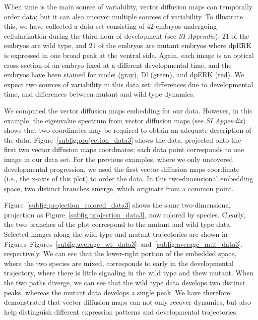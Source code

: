 \documentclass{pnastwo}
\begin{document}
\begin{article}
When time is the main source of variability,
vector diffusion maps can temporally order data; but it can also uncover multiple sources of variability.
%
%
%
To illustrate this, we have collected a data set consisting of $42$ embryos undergoing cellularization during the third hour of development (see {\it SI Appendix}); $21$ of the embryos are wild type, and $21$ of the embryos are mutant embryos where dpERK is expressed in one broad peak at the ventral side.
%
Again, each image is an optical cross-section of an embryo fixed at a different developmental time, and the embryos have been stained for nuclei (gray), Dl (green), and dpERK (red).
%
We expect two sources of variability in this data set: differences due to developmental time, and differences between mutant and wild type dynamics.

We computed the vector diffusion maps embedding for our data.
%
However, in this example, the eigenvalue spectrum from vector diffusion maps (see {\it SI Appendix}) shows that two coordinates may be required to obtain an adequate description of the data. 
%
Figure~\ref{subfig:projection_data3} shows the data, projected onto the first two vector diffusion maps coordinates;
each data point corresponds to one image in our data set.
%
For the previous examples, where we only uncovered developmental progression, we used the first vector diffusion maps coordinate (i.e., the x-axis of this plot) to order the data.
%
In this two-dimensional embedding space, two distinct branches emerge, which originate from a common point.

Figure~\ref{subfig:projection_colored_data3} shows the same two-dimensional projection as Figure~\ref{subfig:projection_data3}, now colored by species.
%
Clearly, the two branches of the plot correspond to the mutant and wild type data.
%
Selected images along the wild type and mutant trajectories are shown in Figures~Figures~\ref{subfig:average_wt_data3}~and~\ref{subfig:average_mut_data3}, respectively.
%
We can see that the lower-right portion of the embedded space, where the two species are mixed, corresponds to early in the developmental trajectory, where there is little signaling in the wild type and thew mutant. 
%
When the two paths diverge, we can see that the wild type data develops two distinct peaks, whereas the mutant data develops a single peak.
%
We have therefore demonstrated that vector diffusion maps can not only recover dynamics, but also help distinguish different expression patterns and developmental trajectories.


\end{article}
\end{document}
